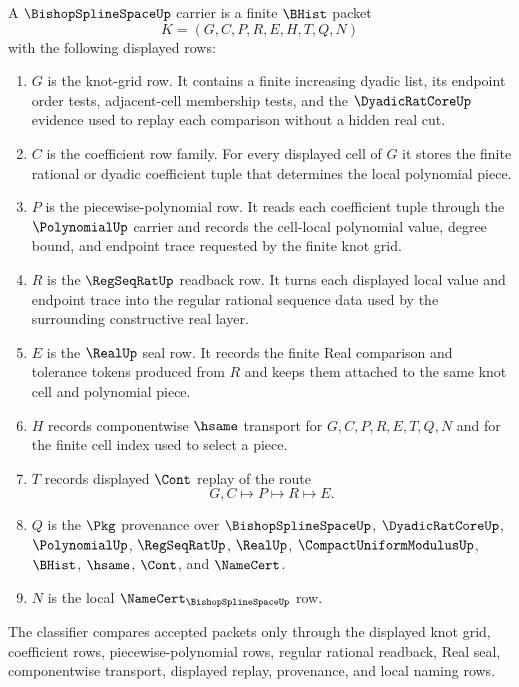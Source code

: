 \begin{definition}
\label{def:bishop-spline-space-carrier}
A $\BishopSplineSpaceUp$ carrier is a finite $\BHist$ packet
$$
K=(G,C,P,R,E,H,T,Q,N)
$$
with the following displayed rows:
\begin{enumerate}
\item $G$ is the knot-grid row. It contains a finite increasing dyadic list, its endpoint order tests, adjacent-cell membership tests, and the $\DyadicRatCoreUp$ evidence used to replay each comparison without a hidden real cut.
\item $C$ is the coefficient row family. For every displayed cell of $G$ it stores the finite rational or dyadic coefficient tuple that determines the local polynomial piece.
\item $P$ is the piecewise-polynomial row. It reads each coefficient tuple through the $\PolynomialUp$ carrier and records the cell-local polynomial value, degree bound, and endpoint trace requested by the finite knot grid.
\item $R$ is the $\RegSeqRatUp$ readback row. It turns each displayed local value and endpoint trace into the regular rational sequence data used by the surrounding constructive real layer.
\item $E$ is the $\RealUp$ seal row. It records the finite Real comparison and tolerance tokens produced from $R$ and keeps them attached to the same knot cell and polynomial piece.
\item $H$ records componentwise $\hsame$ transport for $G,C,P,R,E,T,Q,N$ and for the finite cell index used to select a piece.
\item $T$ records displayed $\Cont$ replay of the route
$$
G,C \longmapsto P \longmapsto R \longmapsto E .
$$
\item $Q$ is the $\Pkg$ provenance over $\BishopSplineSpaceUp$, $\DyadicRatCoreUp$, $\PolynomialUp$, $\RegSeqRatUp$, $\RealUp$, $\CompactUniformModulusUp$, $\BHist$, $\hsame$, $\Cont$, and $\NameCert$.
\item $N$ is the local $\NameCert_{\BishopSplineSpaceUp}$ row.
\end{enumerate}
The classifier compares accepted packets only through the displayed knot grid, coefficient rows, piecewise-polynomial rows, regular rational readback, Real seal, componentwise transport, displayed replay, provenance, and local naming rows.
\end{definition}

